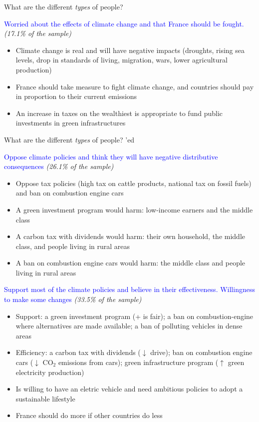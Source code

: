 \begin{framefont}{\small}
\begin{frame}{What are the different \textit{types} of people?}
\begin{itemize}
\ip \textcolor{blue}{Worried about the effects of climate change and that France should be fought.} \textit{(17.1\% of the sample)}
	\begin{itemize}
		\item Climate change is real and will have negative impacts (droughts, rising sea levels, drop in standards of living, migration, wars, lower agricultural production)
		\item France should take measure to fight climate change, and countries should pay in proportion to their current emissions
		\item An increase in taxes on the wealthiest is appropriate to fund public investments in green infrastructures
	\end{itemize}
\end{itemize}
\end{frame}

\begin{frame}{What are the different \textit{types} of people? 'ed}
\begin{itemize}
\ip \textcolor{blue}{Oppose climate policies and think they will have negative distributive consequences} \textit{(26.1\% of the sample)}
	\begin{itemize}
		\item Oppose tax policies (high tax on cattle products, national tax on fossil fuels) and ban on combustion engine cars
		\item A green investment program would harm: low-income earners and the middle class
		\item A carbon tax with dividends would harm: their own household, the middle class, and people living in rural areas
		\item A ban on combustion engine cars would harm: the middle class and people living in rural areas
	\end{itemize}
\ip \textcolor{blue}{Support most of the climate policies and believe in their effectiveness. Willingness to make some changes} \textit{(33.5\% of the sample)}
	\begin{itemize}
		\item Support: a green investment program (+ is fair); a ban on combustion-engine where alternatives are made available; a ban of polluting vehicles in dense areas
		\item Efficiency: a carbon tax with dividends ($\downarrow$ drive); ban on combustion engine cars ($\downarrow$ CO$_\text{2}$ emissions from cars); green infrastructure program ($\uparrow$ green electricity production)
		\item Is willing to have an eletric vehicle and need ambitious policies to adopt a sustainable lifestyle
		\item France should do more if other countries do less
	\end{itemize}
\end{itemize}
\end{frame}



\end{framefont}
